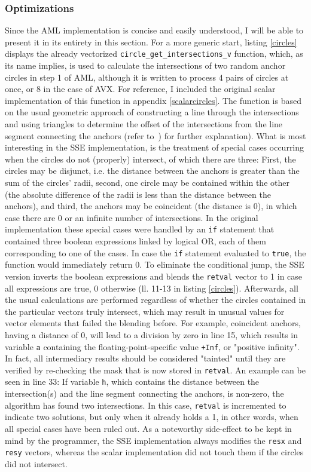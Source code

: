 \subsubsection{Optimizations}
Since the AML implementation is concise and easily understood, I will be able to present it in its entirety in this section. For a more generic start, listing \ref{circles} displays the already vectorized \texttt{circle\_get\_intersections\_v} function, which, as its name implies, is used to calculate the intersections of two random anchor circles in step 1 of AML, although it is written to process 4 pairs of circles at once, or 8 in the case of AVX. For reference, I included the original scalar implementation of this function in appendix \ref{scalarcircles}. The function is based on the usual geometric approach of constructing a line through the intersections and using triangles to determine the offset of the intersections from the line segment connecting the anchors (refer to~\cite{bourke1997circles}) for further explanation). What is most interesting in the SSE implementation, is the treatment of special cases occurring when the circles do not (properly) intersect, of which there are three: First, the circles may be disjunct, i.e. the distance between the anchors is greater than the sum of the circles' radii, second, one circle may be contained within the other (the absolute difference of the radii is less than the distance between the anchors), and third, the anchors may be coincident (the distance is 0), in which case there are 0 or an infinite number of intersections. In the original implementation these special cases were handled by an \texttt{if} statement that contained three boolean expressions linked by logical OR, each of them corresponding to one of the cases. In case the \texttt{if} statement evaluated to \texttt{true}, the function would immediately return 0. To eliminate the conditional jump, the SSE version inverts the boolean expressions and blends the \texttt{retval} vector to 1 in case all expressions are true, 0 otherwise (ll. 11-13 in listing \ref{circles}). Afterwards, all the usual calculations are performed regardless of whether the circles contained in the particular vectors truly intersect, which may result in unusual values for vector elements that failed the blending before. For example, coincident anchors, having a distance of 0, will lead to a division by zero in line 15, which results in variable \texttt{a} containing the floating-point-specific value \texttt{+Inf}, or "positive infinity". In fact, all intermediary results should be considered "tainted" until they are verified by re-checking the mask that is now stored in \texttt{retval}. An example can be seen in line 33: If variable \texttt{h}, which contains the distance between the intersection(s) and the line segment connecting the anchors, is non-zero, the algorithm has found two intersections. In this case, \texttt{retval} is incremented to indicate two solutions, but only when it already holds a 1, in other words, when all special cases have been ruled out. As a noteworthy side-effect to be kept in mind by the programmer, the SSE implementation always modifies the \texttt{resx} and \texttt{resy} vectors, whereas the scalar implementation did not touch them if the circles did not intersect.

